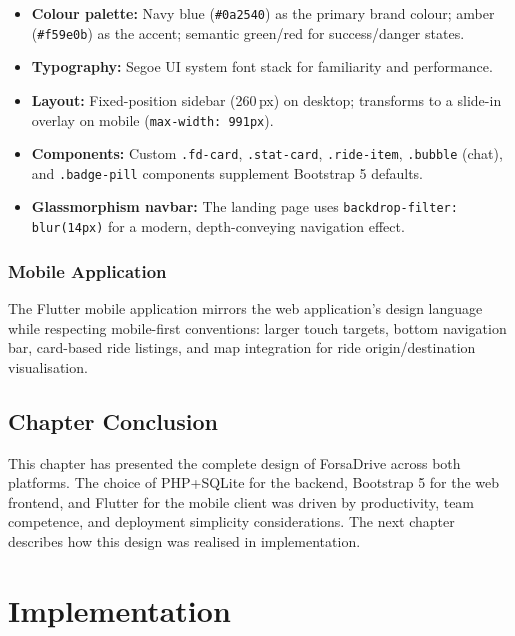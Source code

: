 \documentclass[12pt,a4paper,openright]{report}
\begin{document}
\begin{itemize}[noitemsep]
    \item \textbf{Colour palette:} Navy blue (\texttt{\#0a2540}) as the primary brand colour; amber (\texttt{\#f59e0b}) as the accent; semantic green/red for success/danger states.
    \item \textbf{Typography:} Segoe UI system font stack for familiarity and performance.
    \item \textbf{Layout:} Fixed-position sidebar (260\,px) on desktop; transforms to a slide-in overlay on mobile (\texttt{max-width: 991px}).
    \item \textbf{Components:} Custom \texttt{.fd-card}, \texttt{.stat-card}, \texttt{.ride-item}, \texttt{.bubble} (chat), and \texttt{.badge-pill} components supplement Bootstrap 5 defaults.
    \item \textbf{Glassmorphism navbar:} The landing page uses \texttt{backdrop-filter: blur(14px)} for a modern, depth-conveying navigation effect.
\end{itemize}

\subsection{Mobile Application}

The Flutter mobile application mirrors the web application's design language while respecting mobile-first conventions: larger touch targets, bottom navigation bar, card-based ride listings, and map integration for ride origin/destination visualisation.

\section*{Chapter Conclusion}

This chapter has presented the complete design of ForsaDrive across both platforms. The choice of PHP+SQLite for the backend, Bootstrap 5 for the web frontend, and Flutter for the mobile client was driven by productivity, team competence, and deployment simplicity considerations. The next chapter describes how this design was realised in implementation.

\chapter{Implementation}
\end{document}
